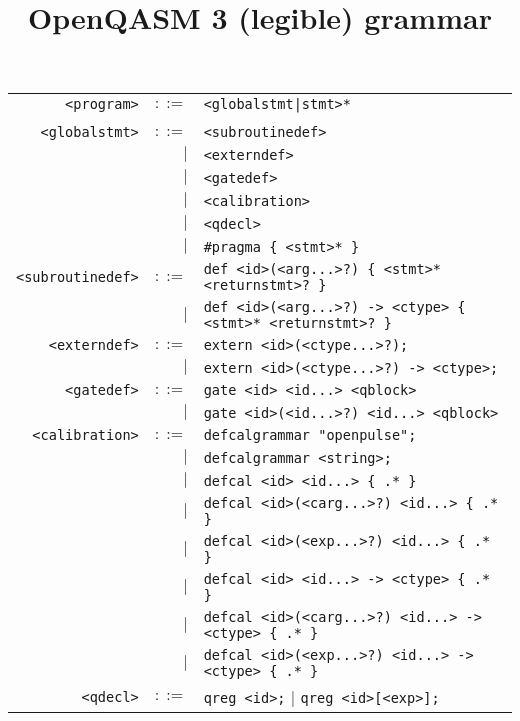 \documentclass[notitlepage]{article}
\title{OpenQASM 3 (legible) grammar}
\date{\vspace{-5ex}}
\begin{document}
\maketitle

\begin{longtable}{rrl}
	\texttt{<program>} & $::=$ & \texttt{<globalstmt|stmt>*} \\ \\
	\texttt{<globalstmt>} & $::=$ & \texttt{<subroutinedef>} \\
	    & $\mid$ & \texttt{<externdef>} \\
	    & $\mid$ & \texttt{<gatedef>} \\
	    & $\mid$ & \texttt{<calibration>} \\
	    & $\mid$ & \texttt{<qdecl>} \\
	    & $\mid$ & \texttt{\#pragma \{ <stmt>* \}} \\
	\texttt{<subroutinedef>} & $::=$ & \texttt{def <id>(<arg...>?) \{ <stmt>* <returnstmt>? \}} \\
	    & $\mid$ & \texttt{def <id>(<arg...>?) -> <ctype> \{ <stmt>* <returnstmt>? \}} \\
	\texttt{<externdef>} & $::=$ & \texttt{extern <id>(<ctype...>?);} \\
	    & $\mid$ & \texttt{extern <id>(<ctype...>?) -> <ctype>;} \\
	\texttt{<gatedef>} & $::=$ & \texttt{gate <id> <id...> <qblock>} \\
	    & $\mid$ & \texttt{gate <id>(<id...>?) <id...> <qblock>} \\
	\texttt{<calibration>} & $::=$ & \texttt{defcalgrammar "openpulse";} \\
	    & $\mid$ & \texttt{defcalgrammar <string>;} \\
	    & $\mid$ & \texttt{defcal <id> <id...> \{ .* \}} \\
	    & $\mid$ & \texttt{defcal <id>(<carg...>?) <id...> \{ .* \}} \\
	    & $\mid$ & \texttt{defcal <id>(<exp...>?) <id...> \{ .* \}} \\
	    & $\mid$ & \texttt{defcal <id> <id...> -> <ctype> \{ .* \}} \\
	    & $\mid$ & \texttt{defcal <id>(<carg...>?) <id...> -> <ctype> \{ .* \}} \\
	    & $\mid$ & \texttt{defcal <id>(<exp...>?) <id...> -> <ctype> \{ .* \}} \\
	\texttt{<qdecl>} & $::=$ & \texttt{qreg <id>;} $\mid$ \texttt{qreg <id>[<exp>];} \\

\end{longtable}
\end{document}
